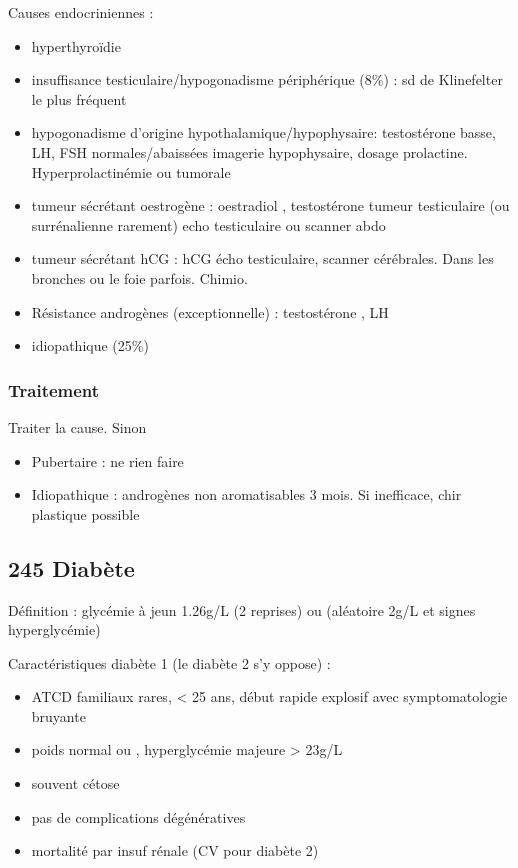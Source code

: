 \documentclass[11pt]{article}
\begin{document}
Causes endocriniennes :
\begin{itemize}
\item hyperthyroïdie
\item insuffisance testiculaire/hypogonadisme périphérique (8\%) : sd de Klinefelter
le plus fréquent
\item hypogonadisme d'origine hypothalamique/hypophysaire: testostérone basse, LH,
FSH normales/abaissées \thus imagerie hypophysaire, dosage
prolactine. Hyperprolactinémie ou tumorale
\item tumeur sécrétant oestrogène : oestradiol \inc, testostérone \dec \thus tumeur
testiculaire (ou surrénalienne rarement) \thus echo testiculaire ou scanner
abdo
\item tumeur sécrétant hCG : \inc hCG \thus écho testiculaire, scanner
cérébrales. Dans les bronches ou le foie parfois. Chimio.
\item Résistance androgènes (exceptionnelle) : testostérone \inc, LH \inc
\item idiopathique (25\%)
\end{itemize}

\subsubsection{Traitement}
\label{sec:org8b7a389}
Traiter la cause. Sinon
\begin{itemize}
\item Pubertaire : ne rien faire
\item Idiopathique : androgènes non aromatisables 3 mois. Si inefficace, chir
plastique possible
\end{itemize}
\subsection{245 Diabète}
\label{sec:orgeb0cfc7}
\begin{tcolorbox}
 Définition : glycémie à jeun \ge 1.26g/L (2 reprises) ou (aléatoire \ge 2g/L et signes hyperglycémie)\footnotemark
\end{tcolorbox}

Caractéristiques diabète 1 (le diabète 2 s'y oppose) : 
\begin{itemize}
\item ATCD familiaux rares, < 25 ans, début rapide explosif avec symptomatologie bruyante
\item poids normal ou \dec, hyperglycémie majeure > 23g/L
\item souvent cétose
\item pas de complications dégénératives
\item mortalité par insuf rénale (CV pour diabète 2)
\end{itemize}
\end{document}
